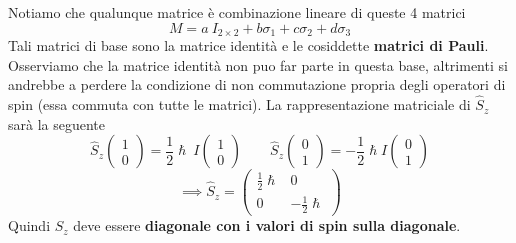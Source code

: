 Notiamo che qualunque matrice è combinazione lineare di queste 4
matrici
\[
    M = a \ I_{2 \times 2} + b \sigma_{1} + c \sigma_{2} + d \sigma_{3}
\]
Tali matrici di base sono la matrice identità e le cosiddette \textbf{matrici di Pauli}.
Osserviamo che la matrice identità non puo far parte in questa base,
altrimenti si andrebbe a perdere la condizione di non commutazione
propria degli operatori di spin (essa commuta con tutte le matrici).
La
rappresentazione matriciale di \(\hat{S}_{z}\) sarà la seguente \[
                                                                    \hat{S}_{z} \begin{pmatrix}
                                                                                    1 \\
                                                                                    0
                                                                    \end{pmatrix} =
                                                                    \frac{1}{2} \hslash \ I
                                                                    \begin{pmatrix}
                                                                        1 \\
                                                                        0
                                                                    \end{pmatrix}
                                                                    \qquad
                                                                    \hat{S}_{z} \begin{pmatrix}
                                                                                    0 \\
                                                                                    1
                                                                    \end{pmatrix}
                                                                    = - \frac{1}{2} \hslash I \begin{pmatrix}
                                                                                                  0 \\
                                                                                                  1
                                                                    \end{pmatrix}
\] \[
       \implies
       \hat{S}_{z} =
       \begin{pmatrix}
           \frac{1}{2} \hslash & 0                     \\
           0                   & - \frac{1}{2} \hslash
       \end{pmatrix}
\] Quindi \(\hat{S}_{z}\) deve essere \textbf{diagonale con i valori di
spin sulla diagonale}.
